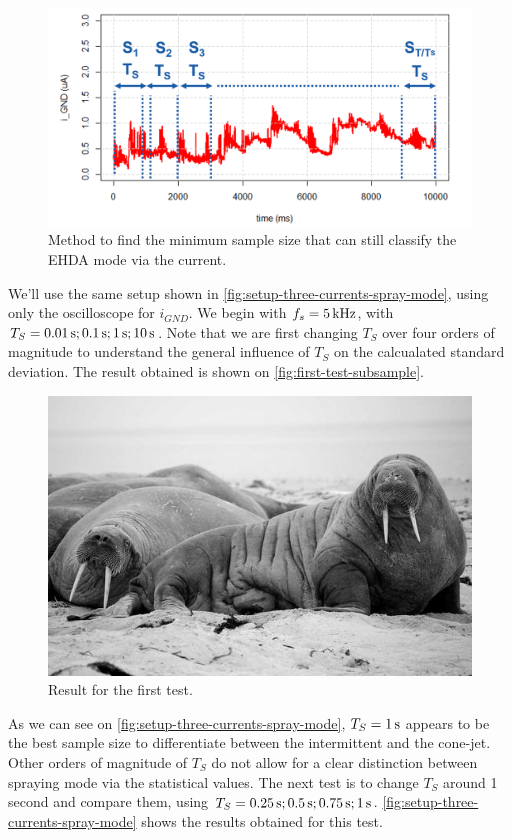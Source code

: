 \documentclass[oneside,12pt]{article}
\begin{document}
\begin{figure}[h!]
    \centering
    \includegraphics[width=.8\textwidth,trim=1 1 1 1,clip]{figures/subsample-size-strategy.png}
    \caption{Method to find the minimum sample size that can still classify the EHDA mode via the current.}
    \label{fig:subsample-size-strategy}
\end{figure}

We'll use the same setup shown in \autoref{fig:setup-three-currents-spray-mode}, using only the oscilloscope for $i_{GND}$.
We begin with $f_s = 5 \,\mathrm{kHz}$, with $T_S = 0.01 \,\mathrm{s}; 0.1 \,\mathrm{s}; 1 \,\mathrm{s}; 10 \,\mathrm{s}$. Note that we are first changing
$T_S$ over four orders of magnitude to understand the general influence of $T_S$ on the calcualated standard deviation.
The result obtained is shown on \autoref{fig:first-test-subsample}.

\begin{figure}[h!]
    \centering
    \includegraphics[width=.8\textwidth,trim=1 1 1 1,clip]{figures/lorem-picsum.jpg}
    \caption{Result for the first test.}
    \label{fig:first-test-subsample}
\end{figure}

As we can see on \autoref{fig:setup-three-currents-spray-mode}, $T_S = 1 \,\mathrm{s}$ appears to be the best sample size to 
differentiate between the intermittent and the cone-jet. Other orders of magnitude of $T_S$ do not allow for a clear distinction
between spraying mode via the statistical values. The next test is to change $T_S$ around 1 second and compare them, 
using $T_S = 0.25 \,\mathrm{s}; 0.5 \,\mathrm{s}; 0.75 \,\mathrm{s}; 1 \,\mathrm{s}$. \autoref{fig:setup-three-currents-spray-mode} shows the results obtained  
for this test.
\end{document}
